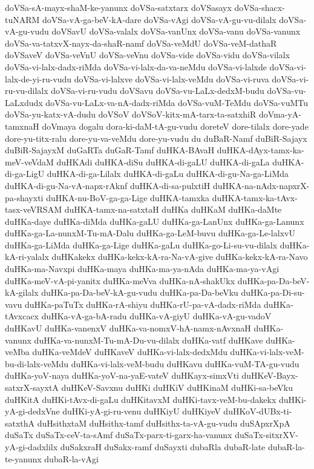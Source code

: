 {doVSa-sA-mayx-shaM-ke-yanunx
doVSa-satxtarx
doVSasayx
doVSa-shacx-tuNARM
doVSa-vA-ga-beV-kA-dare
doVSa-vAgi
doVSa-vA-gu-vu-dilalx
doVSa-vA-gu-vudu
doVSavU
doVSa-valalx
doVSa-vanUnx
doVSa-vanu
doVSa-vanunx
doVSa-va-tatxvX-nayx-da-shaR-namf
doVSa-veMdU
doVSa-veM-dathaR
doVSaveV
doVSa-veVnU
doVSa-veVnu
doVSa-vide
doVSa-vidu
doVSa-vilalx
doVSa-vi-lalx-dadx-riMda
doVSa-vi-lalx-da-va-neMdu
doVSa-vi-lalxde
doVSa-vi-lalx-de-yi-ru-vudu
doVSa-vi-lalxve
doVSa-vi-lalx-veMdu
doVSa-vi-ruva
doVSa-vi-ru-vu-dilalx
doVSa-vi-ru-vudu
doVSavu
doVSa-vu-LaLx-dedxM-budu
doVSa-vu-LaLxdudx
doVSa-vu-LaLx-va-nA-dadx-riMda
doVSa-vuM-TeMdu
doVSa-vuMTu
doVSa-yu-katx-vA-dudu
doVSoV
doVSoV-kitx-mA-tarx-ta-satxhiR
doVma-yA-tamxnaH
doVmaya
dogalu
dora-ki-daM-tA-gu-vudu
doreteV
dore-tilalx
dore-yade
dore-yu-titx-ralu
dore-yu-va-veMdu
dore-yu-vudu
du
duBaR-Namf
duBiR-Sajayx
duBiR-SajayxM
duGaRTa
duGaR-Tamf
duHKA-BAvaH
duHKA-dAyx-tamx-ka-meV-veVdaM
duHKAdi
duHKA-diSu
duHKA-di-gaLU
duHKA-di-gaLa
duHKA-di-ga-LigU
duHKA-di-ga-Lilalx
duHKA-di-gaLu
duHKA-di-gu-Na-ga-LiMda
duHKA-di-gu-Na-vA-napx-rAknf
duHKA-di-sa-pulxtiH
duHKA-na-nAdx-napxrX-pa-shayxti
duHKA-nu-BoV-ga-ga-Lige
duHKA-tamxka
duHKA-tamx-ka-tAvx-tasx-veVRSAM
duHKA-tamx-na-satxtaH
duHKa
duHKaM
duHKa-daMte
duHKa-daye
duHKa-diMda
duHKa-gaLU
duHKa-ga-LanUnx
duHKa-ga-Lanunx
duHKa-ga-La-nunxM-Tu-mA-Dalu
duHKa-ga-LeM-buvu
duHKa-ga-Le-lalxvU
duHKa-ga-LiMda
duHKa-ga-Lige
duHKa-gaLu
duHKa-go-Li-su-vu-dilalx
duHKa-kA-ri-yalalx
duHKakekx
duHKa-kekx-kA-ra-Na-vA-give
duHKa-kekx-kA-ra-Navo
duHKa-ma-Navxpi
duHKa-maya
duHKa-ma-ya-nAda
duHKa-ma-ya-vAgi
duHKa-meV-vA-pi-yanitx
duHKa-meVva
duHKa-nA-shakUkx
duHKa-pa-Da-beV-kA-gilalx
duHKa-pa-Da-beV-kA-gu-vudu
duHKa-pa-Da-beVku
duHKa-pa-Di-su-vavu
duHKa-paTuTx
duHKa-rA-shiyu
duHKa-rU-pa-vA-dadx-riMda
duHKa-tAvxcacx
duHKa-vA-ga-bA-radu
duHKa-vA-giyU
duHKa-vA-gu-vadoV
duHKavU
duHKa-vanenxV
duHKa-va-nomxV-hA-namx-nAvxnaH
duHKa-vanunx
duHKa-va-nunxM-Tu-mA-Du-vu-dilalx
duHKa-vatf
duHKave
duHKa-veMba
duHKa-veMdeV
duHKaveV
duHKa-vi-lalx-dedxMdu
duHKa-vi-lalx-veM-bu-di-lalx-veMdu
duHKa-vi-lalx-veM-budu
duHKavu
duHKa-vuM-TA-gu-vudu
duHKa-yoV-naya
duHKa-yoV-na-yaE-vateV
duHKayx-simxVti
duHKeV-Bayx-satxrX-sayxtA
duHKeV-Savxnu
duHKi
duHKiV
duHKinaM
duHKi-sa-beVku
duHKitA
duHKi-tAvx-di-gaLu
duHKitavxM
duHKi-tavx-veM-bu-dakekx
duHKi-yA-gi-dedxVne
duHKi-yA-gi-ru-venu
duHKiyU
duHKiyeV
duHKoV-dUBx-ti-satxthA
duHsithxtaM
duHsithx-tamf
duHsithx-ta-vA-gu-vudu
duSApxrXpA
duSaTx
duSaTx-ceV-ta-sAmf
duSaTx-parx-ti-garx-ha-vanunx
duSaTx-sitxrXV-yA-gi-dadxlilx
duSakxraH
duSakx-ramf
duSayxti
dubaRla
dubaR-late
dubaR-la-te-yanunx
dubaR-la-vAgi
}
